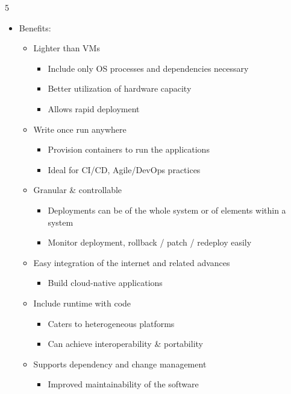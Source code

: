 \documentclass[landscape,a4paper]{extarticle}
\begin{document}
\begin{multicols*}{5}
    \begin{itemize}
        \item Benefits:
        \begin{itemize}
            \item Lighter than VMs
            \begin{itemize}
                \item Include only OS processes and dependencies necessary
                \item Better utilization of hardware capacity
                \item Allows rapid deployment
            \end{itemize}
            \item Write once run anywhere
            \begin{itemize}
                \item Provision containers to run the applications
                \item Ideal for CI/CD, Agile/DevOps practices
            \end{itemize}
            \item Granular \& controllable
            \begin{itemize}
                \item Deployments can be of the whole system or of elements within a system
                \item Monitor deployment, rollback / patch / redeploy easily
            \end{itemize}
            \item Easy integration of the internet and related advances
            \begin{itemize}
                \item Build cloud-native applications
            \end{itemize}
            \item Include runtime with code
            \begin{itemize}
                \item Caters to heterogeneous platforms
                \item Can achieve interoperability \& portability
            \end{itemize}
            \item Supports dependency and change management
            \begin{itemize}
                \item Improved maintainability of the software

\end{itemize}
\end{itemize}
\end{itemize}
\end{multicols*}
\end{document}
